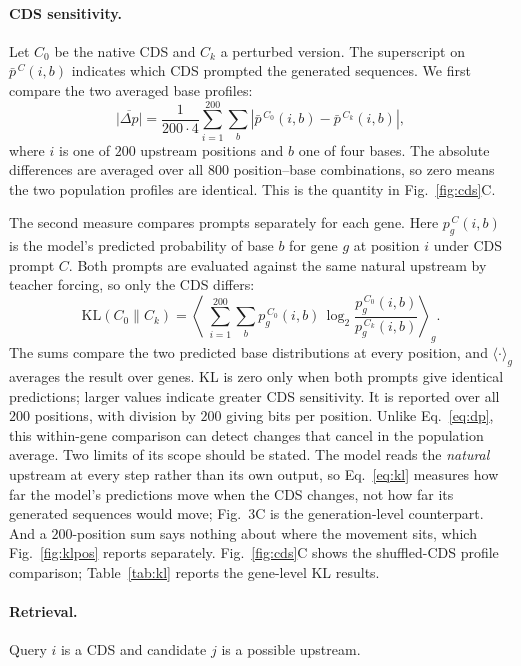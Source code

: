 \documentclass{article}
\newcommand{\rev}[1]{\begingroup\color{red}#1\endgroup}
\begin{document}
\paragraph{CDS sensitivity.} Let $C_0$ be the native CDS and $C_k$ a perturbed
version. The superscript on $\bar p^{\,C}(i,b)$ indicates which CDS prompted the
generated sequences. We first compare the two averaged base profiles:
\begin{equation}
\overline{|\Delta p|}=\frac{1}{200\cdot 4}\sum_{i=1}^{200}\sum_{b}
\left|\bar p^{\,C_0}(i,b)-\bar p^{\,C_k}(i,b)\right|,
\label{eq:dp}
\end{equation}
where $i$ is one of $200$ upstream positions and $b$ one of four bases. The
absolute differences are averaged over all $800$ position--base combinations, so
zero means the two population profiles are identical. This is the quantity in
Fig.~\ref{fig:cds}C.

The second measure compares prompts separately for each gene. Here
$p_g^{\,C}(i,b)$ is the model's predicted probability of base $b$ for gene $g$ at
position $i$ under CDS prompt $C$. Both prompts are evaluated against the same
natural upstream by teacher forcing, so only the CDS differs:
\begin{equation}
\mathrm{KL}(C_0\|C_k)=\left\langle\;\sum_{i=1}^{200}\sum_b
p_g^{\,C_0}(i,b)\,\log_2\frac{p_g^{\,C_0}(i,b)}{p_g^{\,C_k}(i,b)}\right\rangle_{g}.
\label{eq:kl}
\end{equation}
The sums compare the two predicted base distributions at every position, and
$\langle\cdot\rangle_g$ averages the result over genes. KL is zero only when both
prompts give identical predictions; larger values indicate greater CDS sensitivity.
It is reported over all $200$ positions, with division by $200$ giving bits per
position. Unlike Eq.~\ref{eq:dp}, this within-gene comparison can detect changes
that cancel in the population average. \rev{Two limits of its scope should be
stated. The model reads the \emph{natural} upstream at every step rather than its
own output, so Eq.~\ref{eq:kl} measures how far the model's predictions move when
the CDS changes, not how far its generated sequences would move; Fig.~3C is the
generation-level counterpart. And a $200$-position sum says nothing about where
the movement sits, which Fig.~\ref{fig:klpos} reports separately.} Fig.~\ref{fig:cds}C shows the shuffled-CDS
profile comparison; Table~\ref{tab:kl} reports the gene-level KL results.

\paragraph{Retrieval.} Query $i$ is a CDS and candidate $j$ is a possible upstream.
\end{document}

